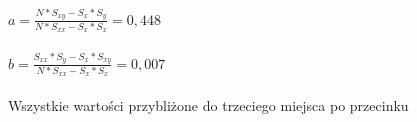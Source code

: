 \documentclass{article}
\begin{document}
\newpage
\begin{center}\huge{$
    a = \frac{N * S_{xy} - S_{x} * S_{y}}{N * S_{xx} - S_{x} * S_{x}} = 0,448
    $} \\ ~ \\
    \huge{$
    b = \frac{S_{xx} * S_{y} - S_{x} * S_{xy}}{N * S_{xx} - S_{x} * S_{x}} = 0,007
    $}\\ ~ \\
    \large{Wszystkie wartości przybliżone do trzeciego miejsca po przecinku}
\end{center}
\end{document}
